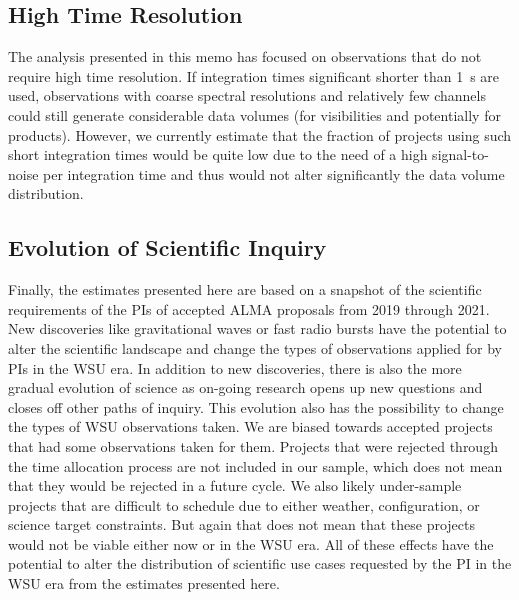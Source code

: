 \documentclass[preprint]{aastex631}
\begin{document}
\subsection{High Time Resolution} \label{sec:discussion_hightimecadence}

The analysis presented in this memo has focused on observations that do not require high time resolution. If integration times significant shorter than 1~s are used, observations with coarse spectral resolutions and relatively few channels could still generate considerable data volumes (for visibilities and potentially for products). However, we currently estimate that the fraction of projects using such short integration times would be quite low due to the need of a high signal-to-noise per integration time and thus would not alter significantly the data volume distribution.

\subsection{Evolution of Scientific Inquiry} \label{sec:discussion_evolution}

Finally, the estimates presented here are based on  a snapshot of the scientific requirements of the PIs of accepted ALMA proposals from 2019 through 2021. New discoveries like gravitational waves or fast radio bursts have the potential to alter the scientific landscape and change the types of observations applied for by PIs in the WSU era. In addition to new discoveries, there is also the more gradual evolution of science as on-going research opens up new questions and closes off other paths of inquiry. This evolution also has the possibility to change the types of WSU observations taken. We are biased towards accepted projects that had some observations taken for them. Projects that were rejected through the time allocation process are not included in our sample, which does not mean that they would be rejected in a future cycle. We also likely under-sample projects that are difficult to schedule due to either weather, configuration, or science target constraints. But again that does not mean that these projects would not be viable either now or in the WSU era. All of these effects have the potential to alter the distribution of scientific use cases requested by the PI in the WSU era from the estimates presented here.



\end{document}
